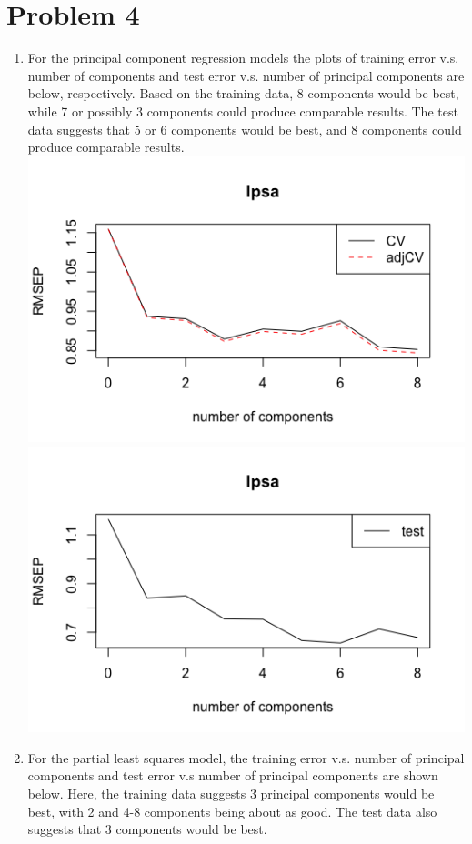 \section*{Problem 4}
\begin{enumerate}
\item For the principal component regression models the plots of training error v.s. number of components and test error v.s. number of principal components are below, respectively. Based on the training data, 8 components would be best, while 7 or possibly 3 components could produce comparable results. The test data suggests that 5 or 6 components would be best, and 8 components could produce comparable results.  \newline 
\includegraphics[width=\textwidth]{img/pcr.png}
\includegraphics[]{img/pcr_test.png}
\item For the partial least squares model, the training error v.s. number of principal components and test error v.s number of principal components are shown below. Here, the training data suggests 3  principal components would be best, with 2 and 4-8 components being about as good. The test data also suggests that 3 components would be best. \newline

\end{enumerate}
